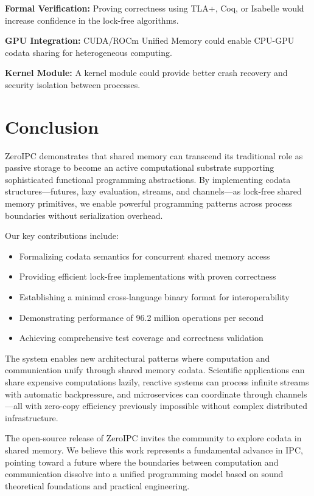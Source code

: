 \documentclass[11pt]{article}
\begin{document}
\textbf{Formal Verification:} Proving correctness using TLA+, Coq, or Isabelle would increase confidence in the lock-free algorithms.

\textbf{GPU Integration:} CUDA/ROCm Unified Memory could enable CPU-GPU codata sharing for heterogeneous computing.

\textbf{Kernel Module:} A kernel module could provide better crash recovery and security isolation between processes.

\section{Conclusion}

ZeroIPC demonstrates that shared memory can transcend its traditional role as passive storage to become an active computational substrate supporting sophisticated functional programming abstractions. By implementing codata structures---futures, lazy evaluation, streams, and channels---as lock-free shared memory primitives, we enable powerful programming patterns across process boundaries without serialization overhead.

Our key contributions include:
\begin{itemize}
\item Formalizing codata semantics for concurrent shared memory access
\item Providing efficient lock-free implementations with proven correctness
\item Establishing a minimal cross-language binary format for interoperability
\item Demonstrating performance of 96.2 million operations per second
\item Achieving comprehensive test coverage and correctness validation
\end{itemize}

The system enables new architectural patterns where computation and communication unify through shared memory codata. Scientific applications can share expensive computations lazily, reactive systems can process infinite streams with automatic backpressure, and microservices can coordinate through channels---all with zero-copy efficiency previously impossible without complex distributed infrastructure.

The open-source release of ZeroIPC invites the community to explore codata in shared memory. We believe this work represents a fundamental advance in IPC, pointing toward a future where the boundaries between computation and communication dissolve into a unified programming model based on sound theoretical foundations and practical engineering.
\end{document}
